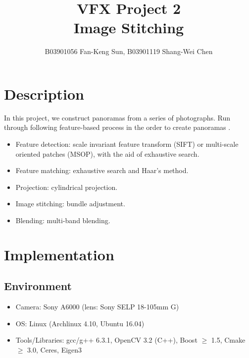 \documentclass[11pt]{article}
\title{\bf{VFX Project 2\\\large{Image Stitching}}\vspace{-10pt}}
\author{B03901056 Fan-Keng Sun, B03901119 Shang-Wei Chen}
\date{}
\begin{document}
\maketitle
\section{Description}
In this project, we construct panoramas from a series of photographs. Run through following feature-based process in the order to create panoramas \cite{ref:panorama}.
\begin{itemize}
  \itemsep=0pt
  \item Feature detection: scale invariant feature transform (SIFT) or multi-scale oriented patches (MSOP), with the aid of exhaustive search.
  \item Feature matching: exhaustive search and Haar's method.
  \item Projection: cylindrical projection.
  \item Image stitching: bundle adjustment.
  \item Blending: multi-band blending.
\end{itemize}
\section{Implementation}
\subsection{Environment}
\begin{itemize}
  \itemsep=0pt
  \item Camera: Sony A6000 (lens: Sony SELP 18-105mm G)
  \item OS: Linux (Archlinux 4.10, Ubuntu 16.04)
  \item Tools/Libraries: gcc/g++ 6.3.1, OpenCV 3.2 (C++), Boost $\geq$ 1.5, Cmake $\geq$ 3.0, Ceres, Eigen3
\end{itemize}
\end{document}
